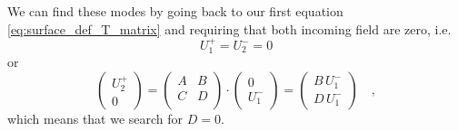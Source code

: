 We can find these modes by going back to our first equation \ref{eq:surface_def_T_matrix} and requiring that both incoming field are zero, i.e. 
\begin{equation}
U_1^+ = U_2^- = 0
\end{equation}
or
\begin{equation}
\begin{pmatrix}
U_2^+ \\ 0
\end{pmatrix}
= 
\begin{pmatrix}
A & B \\ C & D \\
\end{pmatrix}
\cdot
\begin{pmatrix}
0 \\ U_1^-
\end{pmatrix}
= 
\begin{pmatrix}
B \, U_1^- \\ D \, U_1^-
\end{pmatrix} \quad ,
\end{equation}
which means that we search for $D =0$. 

